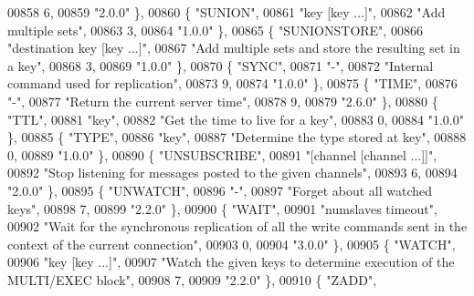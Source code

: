 \begin{DoxyCode}
00858     6,
00859     \textcolor{stringliteral}{"2.0.0"} \},
00860     \{ \textcolor{stringliteral}{"SUNION"},
00861     \textcolor{stringliteral}{"key [key ...]"},
00862     \textcolor{stringliteral}{"Add multiple sets"},
00863     3,
00864     \textcolor{stringliteral}{"1.0.0"} \},
00865     \{ \textcolor{stringliteral}{"SUNIONSTORE"},
00866     \textcolor{stringliteral}{"destination key [key ...]"},
00867     \textcolor{stringliteral}{"Add multiple sets and store the resulting set in a key"},
00868     3,
00869     \textcolor{stringliteral}{"1.0.0"} \},
00870     \{ \textcolor{stringliteral}{"SYNC"},
00871     \textcolor{stringliteral}{"-"},
00872     \textcolor{stringliteral}{"Internal command used for replication"},
00873     9,
00874     \textcolor{stringliteral}{"1.0.0"} \},
00875     \{ \textcolor{stringliteral}{"TIME"},
00876     \textcolor{stringliteral}{"-"},
00877     \textcolor{stringliteral}{"Return the current server time"},
00878     9,
00879     \textcolor{stringliteral}{"2.6.0"} \},
00880     \{ \textcolor{stringliteral}{"TTL"},
00881     \textcolor{stringliteral}{"key"},
00882     \textcolor{stringliteral}{"Get the time to live for a key"},
00883     0,
00884     \textcolor{stringliteral}{"1.0.0"} \},
00885     \{ \textcolor{stringliteral}{"TYPE"},
00886     \textcolor{stringliteral}{"key"},
00887     \textcolor{stringliteral}{"Determine the type stored at key"},
00888     0,
00889     \textcolor{stringliteral}{"1.0.0"} \},
00890     \{ \textcolor{stringliteral}{"UNSUBSCRIBE"},
00891     \textcolor{stringliteral}{"[channel [channel ...]]"},
00892     \textcolor{stringliteral}{"Stop listening for messages posted to the given channels"},
00893     6,
00894     \textcolor{stringliteral}{"2.0.0"} \},
00895     \{ \textcolor{stringliteral}{"UNWATCH"},
00896     \textcolor{stringliteral}{"-"},
00897     \textcolor{stringliteral}{"Forget about all watched keys"},
00898     7,
00899     \textcolor{stringliteral}{"2.2.0"} \},
00900     \{ \textcolor{stringliteral}{"WAIT"},
00901     \textcolor{stringliteral}{"numslaves timeout"},
00902     \textcolor{stringliteral}{"Wait for the synchronous replication of all the write commands sent in the context of the current
       connection"},
00903     0,
00904     \textcolor{stringliteral}{"3.0.0"} \},
00905     \{ \textcolor{stringliteral}{"WATCH"},
00906     \textcolor{stringliteral}{"key [key ...]"},
00907     \textcolor{stringliteral}{"Watch the given keys to determine execution of the MULTI/EXEC block"},
00908     7,
00909     \textcolor{stringliteral}{"2.2.0"} \},
00910     \{ \textcolor{stringliteral}{"ZADD"},

\end{DoxyCode}
